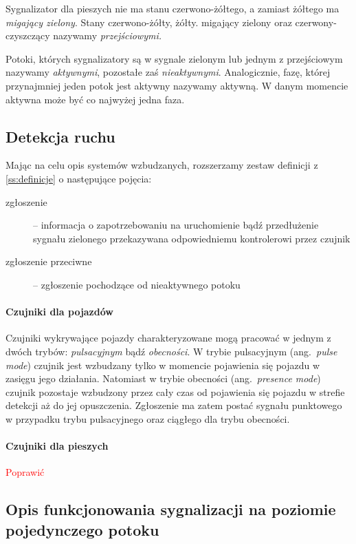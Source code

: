 \documentclass{pracamgr}
\newcommand{\ang}[1]{(ang.~\emph{#1})}
\newcommand{\todo}[1]{\textcolor{red}{#1}}
\theoremstyle{plain}
\begin{document}
Sygnalizator dla pieszych nie ma stanu czerwono-żółtego, a zamiast
żółtego ma \emph{migający zielony}. Stany czerwono-żółty,
żółty. migający zielony oraz czerwony-czyszczący nazywamy
\emph{przejściowymi.}

Potoki, których sygnalizatory są w sygnale zielonym lub jednym z
przejściowym nazywamy \emph{aktywnymi}, pozostałe zaś
\emph{nieaktywnymi}. Analogicznie, fazę, której przynajmniej jeden
potok jest aktywny nazywamy aktywną. W danym momencie aktywna może być
co najwyżej jedna faza.

\subsection{Detekcja ruchu}
\label{ss:detekcja} Mając na celu opis systemów wzbudzanych,
rozszerzamy zestaw definicji z \ref{ss:definicje} o następujące
pojęcia:
\begin{description}
  \item[zgłoszenie] -- informacja o zapotrzebowaniu na uruchomienie
bądź przedłużenie sygnału zielonego przekazywana odpowiedniemu
kontrolerowi przez czujnik
  \item[zgłoszenie przeciwne] -- zgłoszenie pochodzące od nieaktywnego
potoku
\end{description}

\paragraph{Czujniki dla pojazdów} Czujniki wykrywające pojazdy
charakteryzowane mogą pracować w jednym z dwóch trybów:
\emph{pulsacyjnym} bądź \emph{obecności}.  W trybie pulsacyjnym
\ang{pulse mode} czujnik jest wzbudzany tylko w momencie pojawienia
się pojazdu w zasięgu jego działania.  Natomiast w trybie obecności
\ang{presence mode} czujnik pozostaje wzbudzony przez cały czas od
pojawienia się pojazdu w strefie detekcji aż do jej
opuszczenia. Zgłoszenie ma zatem postać sygnału punktowego w przypadku
trybu pulsacyjnego oraz ciągłego dla trybu obecności.

\paragraph{Czujniki dla pieszych} \todo{Poprawić}

\subsection{Opis funkcjonowania sygnalizacji na poziomie pojedynczego
potoku}
\label{ss:schemat}
\end{document}
